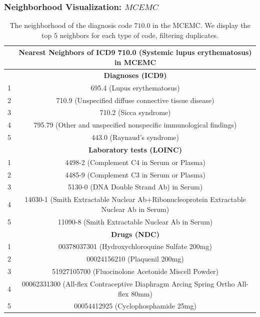 \documentclass{beamer}
\newcommand\T{\rule{0pt}{2.6ex}}       %
\begin{document}
\begin{frame}
\frametitle{Neighborhood Visualization: $MCEMC$}
\begin{table}[t]
\caption{\centering \scriptsize 
The neighborhood of the diagnosis code $710.0$ in the MCEMC. We display
the top $5$ neighbors for each type of code, filtering duplicates.\label{table:nn_diagnosis}}
\tiny
{
\begin{center}
\begin{tabular}{|c|c|}
\hline
& Nearest Neighbors of ICD9 710.0 (Systemic lupus erythematosus) in MCEMC \\
\hline
& {\bf Diagnoses (ICD9) } \T \\
\hline
1 & 695.4 (Lupus erythematosus) \T \\
2 & 710.9 (Unspecified diffuse connective tissue disease) \T \\
3 & 710.2 (Sicca syndrome) \T \\
4 & 795.79 (Other and unspecified nonspecific immunological findings) \T \\
5 & 443.0 (Raynaud's syndrome) \T \\
\hline
& {\bf Laboratory tests (LOINC) } \T \\
\hline
1 & 4498-2 (Complement C4 in Serum or Plasma) \T \\
2 & 4485-9 (Complement C3 in Serum or Plasma) \T \\
3 & 5130-0 (DNA Double Strand Ab) in Serum) \T \\
4 & 14030-1 (Smith Extractable Nuclear Ab+Ribonucleoprotein Extractable Nuclear Ab in Serum) \T \\
5 & 11090-8 (Smith Extractable Nuclear Ab in Serum) \T \\
\hline
& {\bf Drugs (NDC) } \T \\
\hline
1 & 00378037301 (Hydroxychloroquine Sulfate 200mg) \T \\
2 & 00024156210 (Plaquenil 200mg) \T \\
3 & 51927105700 (Fluocinolone Acetonide Miscell Powder) \T \\
4 & 00062331300 (All-flex Contraceptive Diaphragm Arcing Spring Ortho All-flex 80mm) \T \\
5 & 00054412925 (Cyclophosphamide 25mg) \T \\
\hline
\end{tabular}
\end{center}
}
\end{table}
\end{frame}
\end{document}
